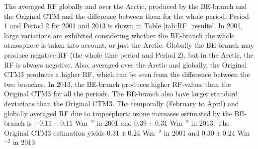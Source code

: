The averaged RF globally and over the Arctic, produced by the BE-branch and the Original CTM and the difference between them for the whole period, Period 1 and Period 2 for 2001 and 2013 is shown in Table \ref{tab:RF_results}. In 2001, large variations are exhibited considering whether the BE-branch the whole atmosphere is taken into account, or just the Arctic. Globally the BE-branch may produce negative RF (the whole time period and Period 2), but in the Arctic, the RF is always negative. Also, averaged over the Arctic and globally, the Original CTM3 produces a higher RF, which can be seen from the difference between the two branches. In 2013, the BE-branch produces higher RF-values than the Original CTM3 for all the periods. The BE-branch also have larger standard deviations than the Original CTM3. The temporally (February to April) and globally averaged RF due to tropospheric ozone increases estimated by the BE-branch is $-0.11\pm0.11$ Wm$^{-2}$ in 2001 and $0.39\pm0.31$ Wm$^{-2}$ in 2013. The Original CTM3 estimation yields  $0.31\pm0.24$ Wm$^{-2}$ in 2001 and $0.30\pm0.24$ Wm$^{-2}$ in 2013










